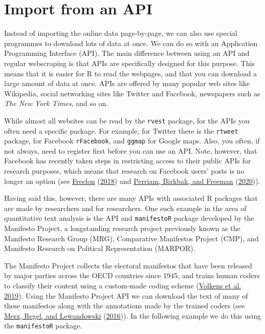 \documentclass[
]{book}
\begin{document}
\hypertarget{import-from-an-api}{%
\section{Import from an API}\label{import-from-an-api}}

Instead of importing the online data page-by-page, we can also use special programmes to download lots of data at once. We can do so with an Application Programming Interface (API). The main difference between using an API and regular webscraping is that APIs are specifically designed for this purpose. This means that it is easier for R to read the webpages, and that you can download a large amount of data at once. APIs are offered by many popular web sites like Wikipedia, social networking sites like Twitter and Facebook, newspapers such as \emph{The New York Times}, and so on.

While almost all websites can be read by the \texttt{rvest} package, for the APIs you often need a specific package. For example, for Twitter there is the \texttt{rtweet} package, for Facebook \texttt{rFacebook}, and \texttt{ggmap} for Google maps. Also, you often, if not always, need to register first before you can use an API. Note, however, that Facebook has recently taken steps in restricting access to their public APIs for research purposes, which means that research on Facebook users' posts is no longer an option (see \protect\hyperlink{ref-Freelon2018}{Freelon} (\protect\hyperlink{ref-Freelon2018}{2018}) and \protect\hyperlink{ref-Perriam2020}{Perriam, Birkbak, and Freeman} (\protect\hyperlink{ref-Perriam2020}{2020})).

Having said this, however, there are many APIs with associated R packages that are made by researchers and for researchers. One such example in the area of quantitative text analysis is the API and \texttt{manifestoR} package developed by the Manifesto Project, a longstanding research project previously known as the Manifesto Research Group (MRG), Comparative Manifestos Project (CMP), and Manifesto Research on Political Representation (MARPOR).

The Manifesto Project collects the electoral manifestos that have been released by major parties across the OECD countries since 1945, and trains human coders to classify their content using a custom-made coding scheme (\protect\hyperlink{ref-Volkens2019a}{Volkens et al. 2019}). Using the Manifesto Project API we can download the text of many of these manifestos along with the annotations made by the trained coders (see \protect\hyperlink{ref-Merz2016}{Merz, Regel, and Lewandowski} (\protect\hyperlink{ref-Merz2016}{2016})). In the following example we do this using the \texttt{manifestoR} package.
\end{document}
